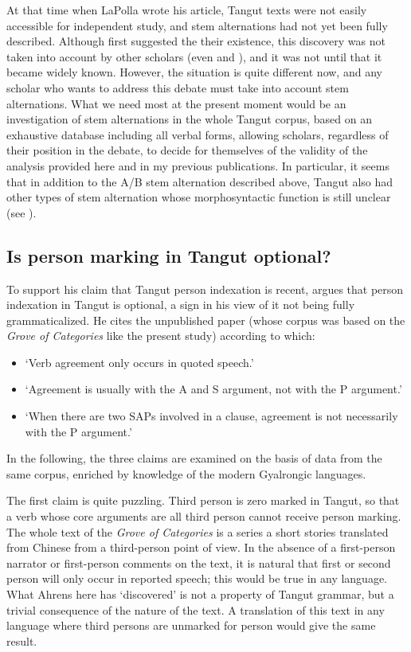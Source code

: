 \documentclass[oldfontcommands,oneside,a4paper,11pt]{article}
\begin{document}
At that time when LaPolla wrote his article, Tangut texts were not easily accessible for independent study, and stem alternations had not yet been fully described. Although \citet{nishida75} first suggested the their existence, this discovery was not taken into account by other scholars (even \citealt{kepping85} and \citealt{driem91tangut}), and it was not until \citet{gong01huying} that it became widely known. However, the situation is quite different now, and any scholar who wants to address this debate must take into account stem alternations. What we need most at the present moment would be an investigation of stem alternations in the whole Tangut corpus, based on an exhaustive database including all verbal forms, allowing scholars, regardless of their position in the debate, to decide for themselves of the validity of the analysis provided here and in my previous publications. In particular, it seems that in addition to the A/B stem alternation described above, Tangut also had other types of stem alternation whose morphosyntactic function is still unclear (see \citealt{jacques14esquisse}).

\subsection{Is person marking in Tangut optional?} \label{sec:optional}
To support his claim that Tangut person indexation is recent, 
\citet{lapolla92} argues that person indexation in Tangut is optional, a sign in his view of it not being fully grammaticalized. He cites the unpublished paper \citet{ahrens90tangut} (whose corpus was based on the \textit{Grove of Categories} like the present study) according to which:

\begin{itemize}
\item `Verb agreement only occurs in quoted speech.'
\item `Agreement is usually with the A and S argument, not with the P argument.'
\item `When there are two SAPs involved in a clause, agreement is not necessarily with the P argument.'
\end{itemize}

In the following, the three claims are examined on the basis of data from the same corpus, enriched by knowledge of the modern Gyalrongic languages.

The first claim is quite puzzling. Third person is zero marked in Tangut, so that a verb whose core arguments are all third person cannot receive person marking. The whole text of the \textit{Grove of Categories} is a series a short stories translated from Chinese from a third-person point of view. In the absence of a first-person narrator or first-person comments on the text, it is natural that first or second person will only occur in reported speech; this would be true in any language. What Ahrens here has `discovered' is not a property of Tangut grammar, but a trivial consequence of the nature of the text. A translation of this text in any language where third persons are unmarked for person would give the same result.
\end{document}
